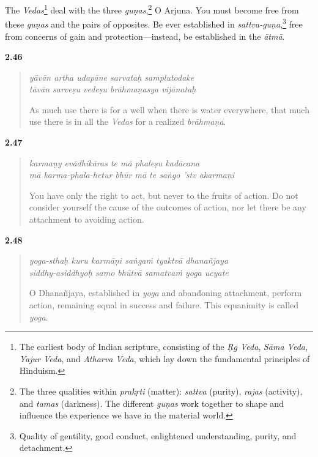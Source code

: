 {The \textit{Vedas}\footnote{The earliest body of Indian scripture, consisting of the \textit{Ṛg Veda}, \textit{Sāma Veda}, \textit{Yajur Veda}, and \textit{Atharva Veda}, which lay down the fundamental principles of Hinduism.} deal with the three \textit{guṇas},\footnote{The three qualities within \textit{prakṛti} (matter): \textit{sattva} (purity), \textit{rajas} (activity), and \textit{tamas} (darkness). The different \textit{guṇas} work together to shape and influence the experience we have in the material world.} O Arjuna. You must become free from these \textit{guṇas} and the pairs of opposites. Be ever established in \textit{sattva-guṇa},\footnote{Quality of gentility, good conduct, enlightened understanding, purity, and detachment.} free from concerns of gain and protection---instead, be established in the \textit{ātmā}.}


\par\noindent\textbf{2.46}\par
\begin{verse}
\textit{yāvān artha udapāne sarvataḥ samplutodake} \\
\textit{tāvān sarveṣu vedeṣu brāhmaṇasya vijānataḥ}

\noindent As much use there is for a well when there is water everywhere, that much use there is in all the \textit{Vedas} for a realized \textit{brāhmaṇa}.
\end{verse}
\par



\par\noindent\textbf{2.47}\par
\begin{verse}
\textit{karmaṇy evādhikāras te mā phaleṣu kadācana} \\
\textit{mā karma-phala-hetur bhūr mā te saṅgo ’stv akarmaṇi}

\noindent You have only the right to act, but never to the fruits of action. Do not consider yourself the cause of the outcomes of action, nor let there be any attachment to avoiding action.
\end{verse}
\par



\par\noindent\textbf{2.48}\par
\begin{verse}
\textit{yoga-sthaḥ kuru karmāṇi saṅgaṁ tyaktvā dhanañjaya} \\
\textit{siddhy-asiddhyoḥ samo bhūtvā samatvaṁ yoga ucyate}

\noindent O Dhanañjaya, established in \textit{yoga} and abandoning attachment, perform action, remaining equal in success and failure. This equanimity is called \textit{yoga}.
\end{verse}
\par



